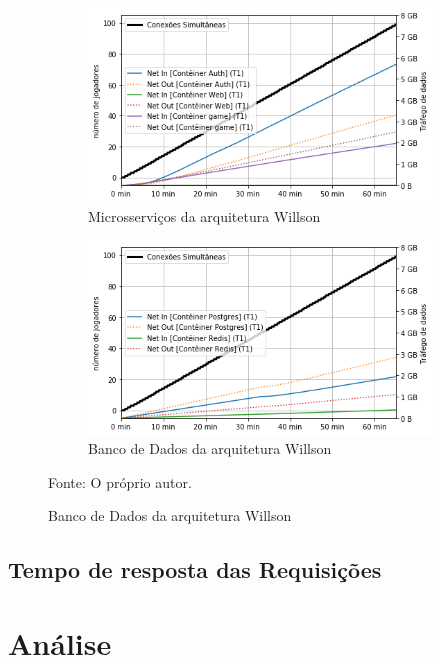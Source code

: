 \begin{figure}[htb!]
        \begin{subfigure}{.5\textwidth}
        \centering
        \includegraphics[width=.95\linewidth]{figuras/testes/w_net_game.png}
        \caption{Microsserviços da arquitetura Willson}
        \label{fig:w_net_game}
    \end{subfigure}%
    \begin{subfigure}{.5\textwidth}
        \centering
        \includegraphics[width=.95\linewidth]{figuras/testes/w_net_db.png}
        \caption{Banco de Dados da arquitetura Willson}
        \label{fig:w_net_db}
    \end{subfigure}%

    Fonte: O próprio autor.
\end{figure}

\subsection{Tempo de resposta das Requisições}

\section{Análise}
